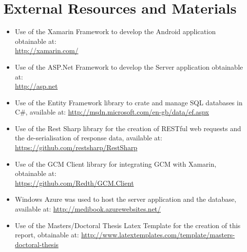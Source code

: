 
\chapter{External Resources and Materials} %

\label{AppendixB} %


\begin{itemize}
	\item Use of the Xamarin Framework to develop the Android application obtainable at:\\ \url{http://xamarin.com/}
	\item Use of the ASP.Net Framework to develop the Server application obtainable at:\\ \url{http://asp.net}
	\item Use of the Entity Framework library to crate and manage SQL databases in C\#, available at: \url{http://msdn.microsoft.com/en-gb/data/ef.aspx}
	\item Use of the Rest Sharp library for the creation of RESTful web requests and the de-serialisation of response data, available at: \url{https://github.com/restsharp/RestSharp}
	\item Use of the GCM Client library for integrating GCM with Xamarin, obtainable at:\\ \url{https://github.com/Redth/GCM.Client}
	\item Windows Azure was used to host the server application and the database, available at:
	\url{http://medibook.azurewebsites.net/}
	\item Use of the Masters/Doctoral Thesis Latex Template for the creation of this report, obtainable at: \url{http://www.latextemplates.com/template/masters-doctoral-thesis}
\end{itemize}